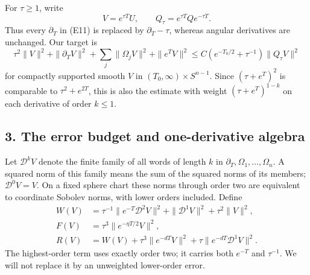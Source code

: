 \documentclass[
  11pt,
]{article}
\makeatletter
\let\ReaderOriginalAnchorStart\hyper@anchorstart
\let\ReaderOriginalAnchorEnd\hyper@anchorend
\let\ReaderPendingAliases\@empty
\def\ReaderArmAliases#1{\gdef\ReaderPendingAliases{#1}}
\def\hyper@anchorstart#1{\ReaderIfNativeAnchorTF{#1}{\ReaderPendingAliases\global\let\ReaderPendingAliases\@empty}{}\ReaderOriginalAnchorStart{#1}}
\makeatother
\begin{document}
For \(\tau\geq1\), write \[
 V=e^{\tau T}U,\qquad Q_\tau=e^{\tau T}Qe^{-\tau T}.
                                                                    \tag{E16}
\] Thus every \(\partial_T\) in (E11) is replaced by
\(\partial_T-\tau\), whereas angular derivatives are unchanged. Our
target is \[
 \tau^2\|V\|^2+\|\partial_TV\|^2+
 \sum_j\|\Omega_jV\|^2+\|e^TV\|^2
 \leq C\left(e^{-T_0/2}+\tau^{-1}\right)\|Q_\tau V\|^2
                                                                    \tag{E17}
\] for compactly supported smooth \(V\) in
\((T_0,\infty)\times S^{n-1}\). Since \((\tau+e^T)^2\) is comparable to
\(\tau^2+e^{2T}\), this is also the estimate with weight
\((\tau+e^T)^{1-k}\) on each derivative of order \(k\leq1\).

\ReaderArmAliases{\ReaderOriginalAnchorStart{AN03-EXU-003}\ReaderOriginalAnchorEnd\begingroup\expandafter\def\csname @currentHref\endcsname{AN03-EXU-003}\label{AN03-EXU-003}\endgroup\ReaderOriginalAnchorStart{an03-exu-003-the-error-budget-and-one-derivative-algebra}\ReaderOriginalAnchorEnd\begingroup\expandafter\def\csname @currentHref\endcsname{an03-exu-003-the-error-budget-and-one-derivative-algebra}\label{an03-exu-003-the-error-budget-and-one-derivative-algebra}\endgroup\ReaderOriginalAnchorStart{3-the-error-budget-and-one-derivative-algebra}\ReaderOriginalAnchorEnd\begingroup\expandafter\def\csname @currentHref\endcsname{3-the-error-budget-and-one-derivative-algebra}\label{3-the-error-budget-and-one-derivative-algebra}\endgroup\ReaderOriginalAnchorStart{the-error-budget-and-one-derivative-algebra}\ReaderOriginalAnchorEnd}
\subsection{3. The error budget and one-derivative
algebra}\label{the-error-budget-and-one-derivative-algebra}

Let \(\mathcal D^k V\) denote the finite family of all words of length
\(k\) in \(\partial_T,\Omega_1,\ldots,\Omega_n\). A squared norm of this
family means the sum of the squared norms of its members;
\(\mathcal D^0V=V\). On a fixed sphere chart these norms through order
two are equivalent to coordinate Sobolev norms, with lower orders
included. Define \[
\begin{split}
 W(V)&=\tau^{-1}\|e^{-T}\mathcal D^2V\|^2
                +\|\mathcal D^1V\|^2+\tau^2\|V\|^2,\\
 F(V)&=\tau^3\|e^{-\eta T/2}V\|^2,\\
 R(V)&=W(V)+\tau^3\|e^{-dT}V\|^2
                         +\tau\|e^{-dT}\mathcal D^1V\|^2.
\end{split}                                                       \tag{E18}
\] The highest-order term uses exactly order two; it carries both
\(e^{-T}\) and \(\tau^{-1}\). We will not replace it by an unweighted
lower-order error.
\end{document}
